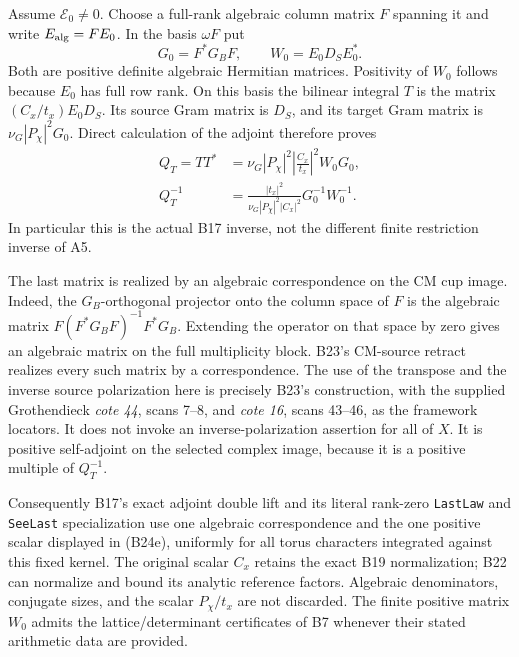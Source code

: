 Assume $\mathcal E_0\ne0$.  Choose a full-rank
algebraic column matrix $F$ spanning it and write
$E_{\rm alg}=F E_0$.  In the basis $\omega F$ put
\[
       G_0=F^*G_BF,
       \qquad W_0=E_0D_SE_0^*.
 \tag{B24d}
\]
Both are positive definite algebraic Hermitian
matrices.  Positivity of $W_0$ follows because
$E_0$ has full row rank.  On this basis the
bilinear integral $T$ is the matrix
$(C_x/t_x)E_0D_S$.  Its source Gram matrix is
$D_S$, and its target Gram matrix is
$\nu_G|P_\chi|^2G_0$.  Direct calculation of
the adjoint therefore proves
\[
 \begin{split}
 Q_T=TT^*&=
      \nu_G|P_\chi|^2\left|\frac{C_x}{t_x}\right|^2
                                      W_0G_0,\\
 Q_T^{-1}&=
      \frac{|t_x|^2}{\nu_G|P_\chi|^2|C_x|^2}
                             G_0^{-1}W_0^{-1}.
 \end{split}
 \tag{B24e}
\]
In particular this is the actual B17 inverse,
not the different finite restriction inverse
of A5.

The last matrix is realized by an algebraic
correspondence on the CM cup image.  Indeed,
the $G_B$-orthogonal projector onto the
column space of $F$ is the algebraic matrix
$F(F^*G_BF)^{-1}F^*G_B$.  Extending the
operator on that space by zero gives an
algebraic matrix on the full multiplicity
block.  B23's CM-source retract realizes
every such matrix by a correspondence.
The use of the transpose and the inverse source
polarization here is precisely B23's construction,
with the supplied Grothendieck \emph{cote 44},
scans 7--8, and \emph{cote 16}, scans 43--46,
as the framework locators.  It does not invoke
an inverse-polarization assertion for all of $X$.
It is positive self-adjoint on the selected
complex image, because it is a positive
multiple of $Q_T^{-1}$.

Consequently B17's exact adjoint double lift
and its literal rank-zero \texttt{LastLaw}
and \texttt{SeeLast} specialization use one
algebraic correspondence and the one positive
scalar displayed in (B24e), uniformly for
all torus characters integrated against this
fixed kernel.  The original scalar $C_x$
retains the exact B19 normalization; B22 can
normalize and bound its analytic reference
factors.  Algebraic denominators, conjugate
sizes, and the scalar $P_\chi/t_x$ are not
discarded.  The finite positive matrix $W_0$
admits the lattice/determinant certificates
of B7 whenever their stated arithmetic data
are provided.

